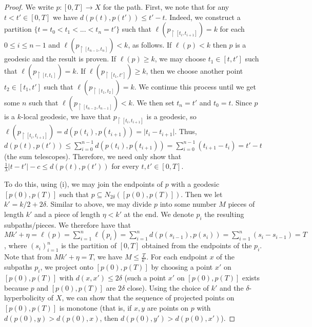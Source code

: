 \documentclass[12pt]{article}
\newcommand{\vs}{\vskip10pt}
\begin{document}
\begin{proof}
		We write $p: [0, T] \rightarrow X$ for the path. First, we note that for any $t < t' \in [0,T]$ we have $d(p(t), p(t')) \leq  t' - t $. Indeed, we construct a partition $\{t = t_0 < t_1 < ... < t_n = t'\}$ such that $\ell(p_{\restriction [t_i, t_{i+1}]}) = k$ for each $0 \leq i  \leq n-1$ and $\ell(p_{\restriction [t_{n-1}, t_{n}]}) < k$, as follows. If $\ell(p) < k$ then $p$ is a geodesic and the result is proven. If $\ell(p) \geq k$, we may choose $t_1 \in [t,t']$ such that $\ell(p_{\restriction [t, t_1]}) = k$. If $\ell(p_{\restriction [t_1, t']}) \geq k$, then we choose another point $t_2 \in [t_1, t']$ such that $\ell(p_{\restriction [t_1, t_2]}) = k$. We continue this process until we get some $n$ such that $\ell(p_{\restriction [t_{n-2}, t_{n-1}]}) < k$. We then set $t_{n} = t'$ and $t_0 = t$. Since $p$ is a $k$-local geodesic, we have that $p_{\restriction [t_i, t_{i+1}]}$ is a geodesic, so $\ell(p_{\restriction [t_i, t_{i+1}]}) = d(p(t_i), p(t_{i+1})) = \vert t_i - t_{i+1} \vert$. Thus, $d(p(t), p(t')) \leq \sum_{i = 0}^{n-1} d(p(t_i), p(t_{i+1})) = \sum_{i=0}^{n-1} (t_{i+1} - t_i) = t' - t$ (the sum telescopes). Therefore, we need only show that $\frac{1}{\lambda}  \vert t - t' \vert - c \leq d(p(t), p(t'))$ for every $t,t' \in [0, T]$. 
		
		\vs 
		
		To do this, using (i), we may join the endpoints of $p$ with a geodesic $[p(0), p(T)]$ such that $p \subseteq N_{2 \delta}([p(0), p(T)])$. Then we let $k' = k/2 + 2 \delta$. Similar to above, we may divide $p$ into some number $M$ pieces of length $k'$ and a piece of length $\eta < k'$ at the end. We denote $p_i$ the resulting subpaths/pieces. We therefore have that $Mk' + \eta = \ell(p) = \sum_{i=1}^n \ell(p_i) = \sum_{i=1}^n d(p(s_{i-1}), p(s_i)) = \sum_{i=1}^n (s_i - s_{i-1}) = T$, where $(s_i)_{i=1}^n$ is the partition of $[0, T]$ obtained from the endpoints of the $p_i$. Note that from $Mk' + \eta = T$, we have $M \leq \frac{T}{k'}$. For each endpoint $x$ of the subpaths $p_i$, we project onto $[p(0), p(T)]$ by choosing a point $x'$ on $[p(0), p(T)]$ with $d(x, x') \leq 2 \delta$ (such a point $x'$ on $[p(0), p(T)]$ exists because $p$ and $[p(0), p(T)]$ are $2 \delta$ close). Using the choice of $k'$ and the $\delta$-hyperbolicity of $X$, we can show that the sequence of projected points on $[p(0), p(T)]$ is monotone (that is, if $x,y$ are points on $p$ with $d(p(0), y) > d(p(0), x)$, then $d(p(0), y') > d(p(0), x')$). 
		
		\vs
		

\end{proof}
\end{document}
